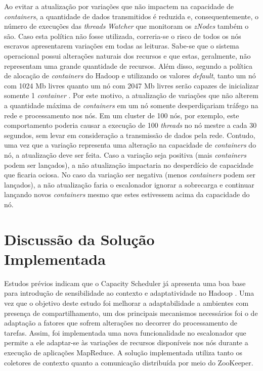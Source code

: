 Ao evitar a atualização por variações que não impactem na capacidade de \textit{containers}, a quantidade de dados transmitidos é reduzida e, consequentemente, o número de execuções das \textit{threads} \textit{Watcher} que monitoram os \textit{zNodes} também o são. Caso esta política não fosse utilizada, correria-se o risco de todos os nós escravos apresentarem variações em todas as leituras. Sabe-se que o sistema operacional possui alterações naturais dos recursos e que estas, geralmente, não representam uma grande quantidade de recursos. Além disso, segundo a política de alocação de \textit{containers} do Hadoop e utilizando os valores \textit{default}, tanto um nó com 1024 Mb livres quanto um nó com 2047 Mb livres serão capazes de inicializar somente 1 \textit{container} \cite{tg}. Por este motivo, a atualização de variações que não alterem a quantidade máxima de \textit{containers} em um nó somente desperdiçariam tráfego na rede e processamento nos nós. Em um cluster de 100 nós, por exemplo, este comportamento poderia causar a execução de 100 \textit{threads} no nó mestre a cada 30 segundos, sem levar em consideração a transmissão de dados pela rede. Contudo, uma vez que a variação representa uma alteração na capacidade de \textit{containers} do nó, a atualização deve ser feita. Caso a variação seja positiva (mais \textit{containers} podem ser lançados), a não atualização impactaria no desperdício de capacidade que ficaria ociosa. No caso da variação ser negativa (menos \textit{containers} podem ser lançados), a não atualização faria o escalonador ignorar a sobrecarga e continuar lançando novos \textit{containers} mesmo que estes estivessem acima da capacidade do nó.

\section{Discussão da Solução Implementada}
\label{sec:solucao}
Estudos prévios indicam que o Capacity Scheduler já apresenta uma boa base para introdução de sensibilidade ao contexto e adaptatividade no Hadoop \cite{tg}. Uma vez que o objetivo deste estudo foi melhorar a adaptabilidade a ambientes com presença de compartilhamento, um dos principais mecanismos necessários foi o de adaptação a fatores que sofrem alterações no decorrer do processamento de tarefas. Assim, foi implementada uma nova funcionalidade no escalonador que permite a ele adaptar-se às variações de recursos disponíveis nos nós durante a execução de aplicações MapReduce. A solução implementada utiliza tanto os coletores de contexto quanto a comunicação distribuída por meio do ZooKeeper.

